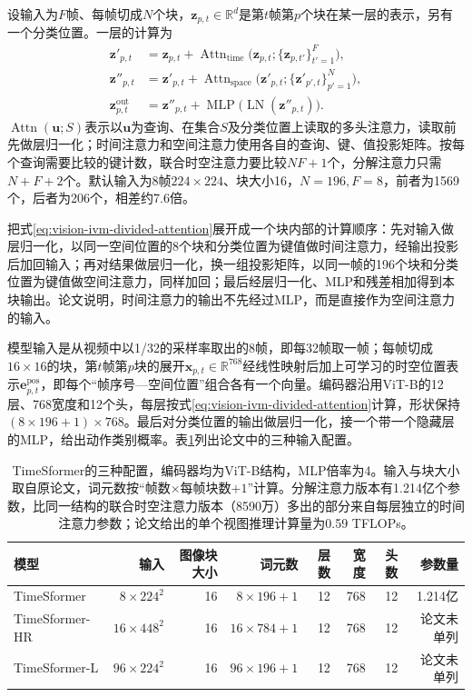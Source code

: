 设输入为$F$帧、每帧切成$N$个块，$\bm z_{p,t}\in\mathbb R^{d}$是第$t$帧第$p$个块在某一层的表示，另有一个分类位置。一层的计算为
\begin{equation}
  \begin{aligned}
    \bm z'_{p,t}&=\bm z_{p,t}+\operatorname{Attn}_{\mathrm{time}}
      \bigl(\bm z_{p,t};\{\bm z_{p,t'}\}_{t'=1}^{F}\bigr),\\
    \bm z''_{p,t}&=\bm z'_{p,t}+\operatorname{Attn}_{\mathrm{space}}
      \bigl(\bm z'_{p,t};\{\bm z'_{p',t}\}_{p'=1}^{N}\bigr),\\
    \bm z^{\mathrm{out}}_{p,t}&=\bm z''_{p,t}+\operatorname{MLP}\bigl(\operatorname{LN}(\bm z''_{p,t})\bigr).
  \end{aligned}
  \label{eq:vision-ivm-divided-attention}
\end{equation}
$\operatorname{Attn}(\bm u;S)$表示以$\bm u$为查询、在集合$S$及分类位置上读取的多头注意力，读取前先做层归一化；时间注意力和空间注意力使用各自的查询、键、值投影矩阵。按每个查询需要比较的键计数，联合时空注意力要比较$NF+1$个，分解注意力只需$N+F+2$个。默认输入为8帧$224\times224$、块大小16，$N=196,F=8$，前者为1569个，后者为206个，相差约7.6倍。

把式\eqref{eq:vision-ivm-divided-attention}展开成一个块内部的计算顺序：先对输入做层归一化，以同一空间位置的8个块和分类位置为键值做时间注意力，经输出投影后加回输入；再对结果做层归一化，换一组投影矩阵，以同一帧的196个块和分类位置为键值做空间注意力，同样加回；最后经层归一化、MLP和残差相加得到本块输出。论文说明，时间注意力的输出不先经过MLP，而是直接作为空间注意力的输入。

模型输入是从视频中以1/32的采样率取出的8帧，即每32帧取一帧；每帧切成$16\times16$的块，第$t$帧第$p$块的展开$\bm x_{p,t}\in\mathbb R^{768}$经线性映射后加上可学习的时空位置表示$\bm e^{\mathrm{pos}}_{p,t}$，即每个“帧序号—空间位置”组合各有一个向量。编码器沿用ViT-B的12层、768宽度和12个头，每层按式\eqref{eq:vision-ivm-divided-attention}计算，形状保持$(8\times196+1)\times768$。最后对分类位置的输出做层归一化，接一个带一个隐藏层的MLP，给出动作类别概率。表\ref{tab:vision-ivm-timesformer-configs}列出论文中的三种输入配置。

\begin{table}[tbp]
  \centering
  \small
  \begin{tabular}{@{}lrrrrrrr@{}}
    \toprule
    模型 & 输入 & 图像块大小 & 词元数 & 层数 & 宽度 & 头数 & 参数量\\
    \midrule
    TimeSformer & $8\times224^2$ & 16 & $8\times196+1$ & 12 & 768 & 12 & 1.214亿\\
    TimeSformer-HR & $16\times448^2$ & 16 & $16\times784+1$ & 12 & 768 & 12 & 论文未单列\\
    TimeSformer-L & $96\times224^2$ & 16 & $96\times196+1$ & 12 & 768 & 12 & 论文未单列\\
    \bottomrule
  \end{tabular}
  \caption{TimeSformer的三种配置，编码器均为ViT-B结构，MLP倍率为4。输入与块大小取自原论文，词元数按“帧数$\times$每帧块数$+1$”计算。分解注意力版本有1.214亿个参数，比同一结构的联合时空注意力版本（8590万）多出的部分来自每层独立的时间注意力参数；论文给出的单个视图推理计算量为0.59 TFLOPs。}
  \label{tab:vision-ivm-timesformer-configs}
\end{table}

